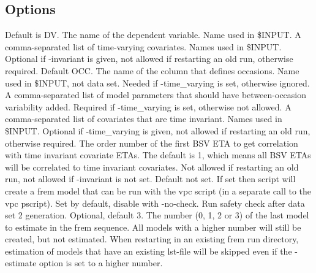 \subsection{Options}
\begin{optionlist}
Default is DV. The name of the dependent variable. Name used in \$INPUT. 
\nextopt
{}
A comma-separated list of time-varying covariates. Names used in \$INPUT. Optional if -invariant is given, not allowed if restarting an old run, otherwise required. 
\nextopt
{}
Default OCC. The name of the column that defines occasions. Name used in \$INPUT, not data set. Needed if -time\_varying is set, otherwise ignored.   
\nextopt
{}
A comma-separated list of model parameters that should have between-occasion variability added. 
Required if -time\_varying is set, otherwise not allowed. 
\nextopt
{}
A comma-separated list of covariates that are time invariant. Names used in \$INPUT. Optional if -time\_varying is given, not allowed if restarting an old run, otherwise required. 
\nextopt
{}
The order number of the first BSV ETA to get correlation with time invariant covariate ETAs. The default is 1, which means all 
BSV ETAs will be correlated to time invariant covariates. Not allowed if restarting an old run, not allowed if -invariant is not set.
\nextopt
{}
Default not set. If set then script will create a frem model that can be run with the vpc script (in a separate call to the vpc pscript).  
\nextopt
{}
Set by default, disable with -no-check. Run safety check after data set 2 generation. 
\nextopt
{}
Optional, default 3. The number (0, 1, 2 or 3) of the last model to estimate in the frem sequence. All models with a higher number will still be created, but not estimated. When restarting in an existing frem run directory, estimation of models that have an existing lst-file will be skipped even if the -estimate option is set to a higher number.
\nextopt
\end{optionlist}

